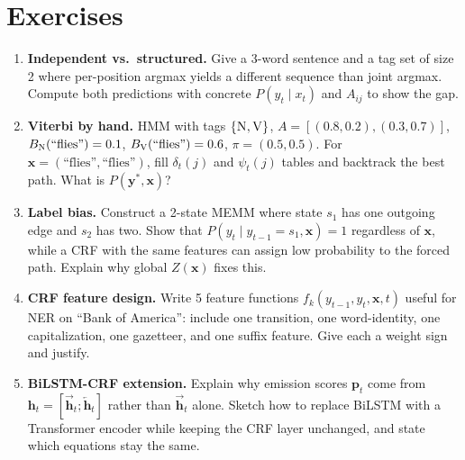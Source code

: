 \section{Exercises}
\label{sec:ch04-exercises}
\begin{enumerate}[label=E4.\arabic*, leftmargin=*, itemsep=0.7em]
    \item \textbf{Independent vs.\ structured.} Give a 3-word sentence and a tag set of size 2 where per-position argmax yields a different sequence than joint argmax. Compute both predictions with concrete $P(y_t\mid x_t)$ and $A_{ij}$ to show the gap.
    \item \textbf{Viterbi by hand.} HMM with tags $\{\textsc{N},\textsc{V}\}$, $A=[(0.8,0.2),(0.3,0.7)]$, $B_{\textsc{N}}(\text{``flies''})=0.1$, $B_{\textsc{V}}(\text{``flies''})=0.6$, $\pi=(0.5,0.5)$. For $\mathbf{x}=(\text{``flies''},\text{``flies''})$, fill $\delta_t(j)$ and $\psi_t(j)$ tables and backtrack the best path. What is $P(\mathbf{y}^*,\mathbf{x})$?
    \item \textbf{Label bias.} Construct a 2-state MEMM where state $s_1$ has one outgoing edge and $s_2$ has two. Show that $P(y_t\mid y_{t-1}=s_1,\mathbf{x})=1$ regardless of $\mathbf{x}$, while a CRF with the same features can assign low probability to the forced path. Explain why global $Z(\mathbf{x})$ fixes this.
    \item \textbf{CRF feature design.} Write 5 feature functions $f_k(y_{t-1},y_t,\mathbf{x},t)$ useful for NER on ``Bank of America'': include one transition, one word-identity, one capitalization, one gazetteer, and one suffix feature. Give each a weight sign and justify.
    \item \textbf{BiLSTM-CRF extension.} Explain why emission scores $\mathbf{p}_t$ come from $\mathbf{h}_t=[\overrightarrow{\mathbf{h}}_t;\overleftarrow{\mathbf{h}}_t]$ rather than $\overrightarrow{\mathbf{h}}_t$ alone. Sketch how to replace BiLSTM with a Transformer encoder while keeping the CRF layer unchanged, and state which equations stay the same.
\end{enumerate}

